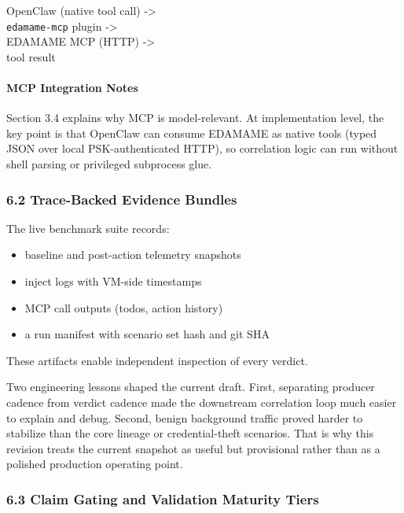 \documentclass[
]{article}
\providecommand{\tightlist}{%
  \setlength{\itemsep}{0pt}\setlength{\parskip}{0pt}}
\begin{document}
OpenClaw (native tool call) -\textgreater{}\\
\texttt{edamame-mcp} plugin -\textgreater{}\\
EDAMAME MCP (HTTP) -\textgreater{}\\
tool result

\paragraph{MCP Integration Notes}\label{mcp-integration-notes}

Section 3.4 explains why MCP is model-relevant. At implementation level,
the key point is that OpenClaw can consume EDAMAME as native tools
(typed JSON over local PSK-authenticated HTTP), so correlation logic can
run without shell parsing or privileged subprocess glue.

\subsubsection{6.2 Trace-Backed Evidence
Bundles}\label{trace-backed-evidence-bundles}

The live benchmark suite records:

\begin{itemize}
\tightlist
\item
  baseline and post-action telemetry snapshots
\item
  inject logs with VM-side timestamps
\item
  MCP call outputs (todos, action history)
\item
  a run manifest with scenario set hash and git SHA
\end{itemize}

These artifacts enable independent inspection of every verdict.

Two engineering lessons shaped the current draft. First, separating
producer cadence from verdict cadence made the downstream correlation
loop much easier to explain and debug. Second, benign background traffic
proved harder to stabilize than the core lineage or credential-theft
scenarios. That is why this revision treats the current snapshot as
useful but provisional rather than as a polished production operating
point.

\subsubsection{6.3 Claim Gating and Validation Maturity
Tiers}\label{claim-gating-and-validation-maturity-tiers}
\end{document}
